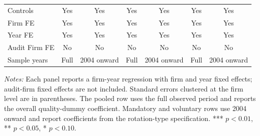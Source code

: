 \begin{table}[htbp]
\begin{threeparttable}
{\begin{tabular}{l cc cc cc}
\midrule
Controls & Yes & Yes & Yes & Yes & Yes & Yes \\
Firm FE & Yes & Yes & Yes & Yes & Yes & Yes \\
Year FE & Yes & Yes & Yes & Yes & Yes & Yes \\
Audit Firm FE & No & No & No & No & No & No \\
Sample years & Full & 2004 onward & Full & 2004 onward & Full & 2004 onward \\
\bottomrule
\end{tabular}}
\begin{tablenotes}\footnotesize
\item \textit{Notes:} Each panel reports a firm-year regression with firm and year fixed effects; audit-firm fixed effects are not included. Standard errors clustered at the firm level are in parentheses. The pooled row uses the full observed period and reports the overall quality-dummy coefficient. Mandatory and voluntary rows use 2004 onward and report coefficients from the rotation-type specification. *** \(p<0.01\), ** \(p<0.05\), * \(p<0.10\).
\end{tablenotes}
\end{threeparttable}
\end{table}
